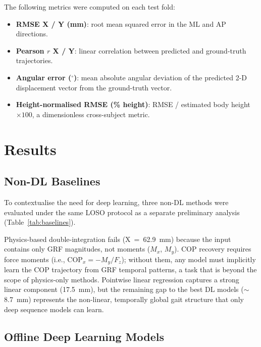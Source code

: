 \documentclass[preprint,12pt]{elsarticle}
\begin{document}
The following metrics were computed on each test fold:
\begin{itemize}
  \item \textbf{RMSE X / Y (mm)}: root mean squared error in the ML and AP
        directions.
  \item \textbf{Pearson $r$ X / Y}: linear correlation between predicted and
        ground-truth trajectories.
  \item \textbf{Angular error ($^\circ$)}: mean absolute angular deviation of the
        predicted 2-D displacement vector from the ground-truth vector.
  \item \textbf{Height-normalised RMSE (\% height)}: RMSE / estimated body
        height $\times 100$, a dimensionless cross-subject metric.
\end{itemize}

\section{Results}
\label{sec:results}

\subsection{Non-DL Baselines}
\label{subsec:baselines}

To contextualise the need for deep learning, three non-DL methods were evaluated
under the same LOSO protocol as a separate preliminary analysis
(Table~\ref{tab:baselines}).

Physics-based double-integration fails (X~=~62.9~mm) because the input contains
only GRF magnitudes, not moments ($M_x$, $M_y$).
COP recovery requires force moments (i.e., $\mathrm{COP}_x = -M_y / F_z$);
without them, any model must implicitly learn the COP trajectory from GRF temporal
patterns, a task that is beyond the scope of physics-only methods.
Pointwise linear regression captures a strong linear component (17.5~mm), but the
remaining gap to the best DL models ($\sim$8.7~mm) represents the non-linear,
temporally global gait structure that only deep sequence models can learn.

\subsection{Offline Deep Learning Models}
\label{subsec:offline}
\end{document}
